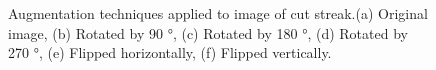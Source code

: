 \begin{figure}[!h]
\begin{subfigure}[t]{.15\textwidth}
        \label{fig:cutlineagvert}
        \caption{}
    \end{subfigure}
    \caption[Augmentation techniques applied to image of cut streak.]
    {Augmentation techniques applied to image of cut streak.(a) Original image, (b) Rotated by 90 °, (c) Rotated by 180 °, (d) Rotated by 270 °, (e) Flipped horizontally, (f) Flipped vertically. }
    \label{fig:agcutline}
\end{figure}

